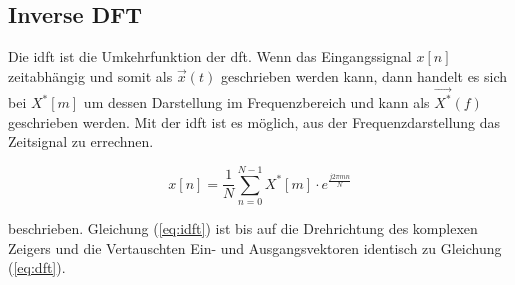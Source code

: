 \subsection{Inverse DFT}

Die \gls{idft} ist die Umkehrfunktion der \gls{dft}. Wenn das Eingangssignal $x[n]$ zeitabhängig und somit als $\vec{x}(t)$ geschrieben werden kann, dann handelt es sich bei $X^*[m]$ um
dessen Darstellung im Frequenzbereich und kann als $\vec{X^*}(f)$ geschrieben werden. Mit der \gls{idft} ist es möglich, aus der Frequenzdarstellung das Zeitsignal zu errechnen.

\begin{equation}\label{eq:idft}
 x \left[ n \right] = \frac{1}{N} \sum^{N-1}_{n=0} X^*[m] \cdot e^{\frac{j 2 \pi m n}{N}}
\end{equation}

beschrieben. Gleichung (\ref{eq:idft}) ist bis auf die Drehrichtung des komplexen Zeigers und die Vertauschten Ein- und Ausgangsvektoren identisch zu Gleichung (\ref{eq:dft}).